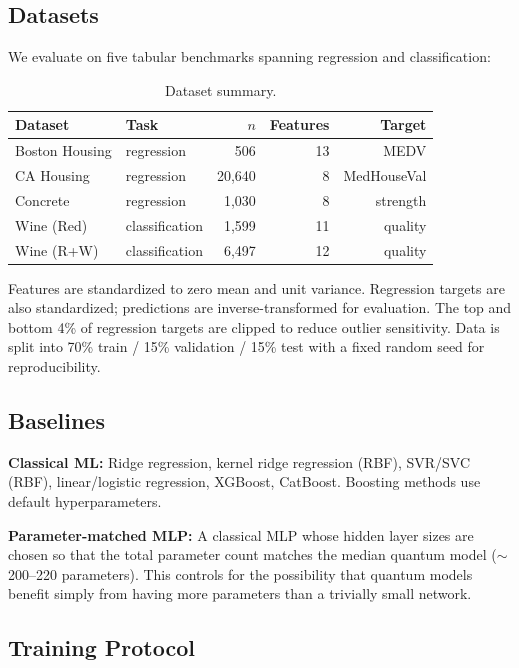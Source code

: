 
\subsection{Datasets}

We evaluate on five tabular benchmarks spanning regression and classification:

\begin{table}[h]
\centering
\small
\begin{tabular}{llrrr}
\toprule
Dataset & Task & $n$ & Features & Target \\
\midrule
Boston Housing & regression & 506 & 13 & MEDV \\
CA Housing & regression & 20{,}640 & 8 & MedHouseVal \\
Concrete & regression & 1{,}030 & 8 & strength \\
Wine (Red) & classification & 1{,}599 & 11 & quality \\
Wine (R+W) & classification & 6{,}497 & 12 & quality \\
\bottomrule
\end{tabular}
\caption{Dataset summary.}
\label{tab:datasets}
\end{table}

Features are standardized to zero mean and unit variance.  Regression targets
are also standardized; predictions are inverse-transformed for evaluation.
The top and bottom 4\% of regression targets are clipped to reduce outlier
sensitivity.  Data is split into 70\% train / 15\% validation / 15\% test
with a fixed random seed for reproducibility.

\subsection{Baselines}

\textbf{Classical ML:} Ridge regression, kernel ridge regression (RBF),
SVR/SVC (RBF), linear/logistic regression, XGBoost, CatBoost.  Boosting
methods use default hyperparameters.

\textbf{Parameter-matched MLP:} A classical MLP whose hidden layer sizes
are chosen so that the total parameter count matches the median quantum
model (${\sim}$200--220 parameters).  This controls for the possibility
that quantum models benefit simply from having more parameters than a
trivially small network.

\subsection{Training Protocol}

